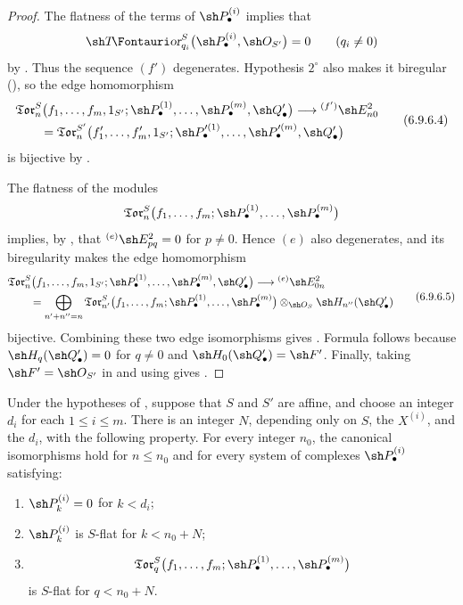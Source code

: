 \begin{proof}
The flatness of the terms of $\sh P_\bullet^{(i)}$ implies that
\[
  \shTor_{q_i}^S
  \bigl(
    \sh P_\bullet^{(i)},\sh O_{S'}
  \bigr)
  =
  0
  \qquad(q_i\neq0)
\]
by .  Thus the sequence $(f')$ degenerates.
Hypothesis $2^\circ$ also makes it biregular
(), so the edge homomorphism
\[
\begin{split}
  &
  \mathfrak{Tor}_n^S
  \bigl(
    f_1,\ldots,f_m,1_{S'};
    \sh P_\bullet^{(1)},\ldots,\sh P_\bullet^{(m)},
    \sh Q_\bullet'
  \bigr)
  \longrightarrow
  {}^{(f')}\sh E_{n0}^2
  \\
  &\qquad =
  \mathfrak{Tor}_n^{S'}
  \bigl(
    f_1',\ldots,f_m',1_{S'};
    \sh P_\bullet^{\prime(1)},\ldots,
    \sh P_\bullet^{\prime(m)},\sh Q_\bullet'
  \bigr)
\end{split}
  \tag{6.9.6.4}\label{III.6.9.6.4.eq}
\]
is bijective by .

The flatness of the modules
\[
  \mathfrak{Tor}_n^S
  \bigl(
    f_1,\ldots,f_m;
    \sh P_\bullet^{(1)},\ldots,\sh P_\bullet^{(m)}
  \bigr)
\]
implies, by , that
${}^{(e)}\sh E_{pq}^2=0$ for $p\neq0$.  Hence $(e)$ also
degenerates, and its biregularity makes the edge homomorphism
\[
\begin{split}
  &
  \mathfrak{Tor}_n^S
  \bigl(
    f_1,\ldots,f_m,1_{S'};
    \sh P_\bullet^{(1)},\ldots,\sh P_\bullet^{(m)},
    \sh Q_\bullet'
  \bigr)
  \longrightarrow
  {}^{(e)}\sh E_{0n}^2
  \\
  &\qquad =
  \bigoplus_{n'+n''=n}
  \mathfrak{Tor}_{n'}^S
  \bigl(
    f_1,\ldots,f_m;
    \sh P_\bullet^{(1)},\ldots,\sh P_\bullet^{(m)}
  \bigr)
  \otimes_{\sh O_S}
  \sh H_{n''}(\sh Q_\bullet')
\end{split}
  \tag{6.9.6.5}\label{III.6.9.6.5.eq}
\]
bijective.  Combining these two edge isomorphisms gives
.  Formula  follows because
$\sh H_q(\sh Q_\bullet')=0$ for $q\neq0$ and
$\sh H_0(\sh Q_\bullet')=\sh F'$.  Finally, taking
$\sh F'=\sh O_{S'}$ in  and using
 gives .
\end{proof}

\begin{corollary}[6.9.7]
\label{III.6.9.7}
Under the hypotheses of , suppose that $S$ and
$S'$ are affine, and choose an integer $d_i$ for each
$1\leq i\leq m$.  There is an integer $N$, depending only on $S$,
the $X^{(i)}$, and the $d_i$, with the following property.  For
every integer $n_0$, the canonical isomorphisms
 hold for $n\leq n_0$ and for every system of
complexes $\sh P_\bullet^{(i)}$ satisfying:
\begin{enumerate}
  \item[$1^\circ$] $\sh P_k^{(i)}=0$ for $k<d_i$;
  \item[$2^\circ$] $\sh P_k^{(i)}$ is $S$-flat for
  $k<n_0+N$;
  \item[$3^\circ$]
  \[
    \mathfrak{Tor}_q^S
    \bigl(
      f_1,\ldots,f_m;
      \sh P_\bullet^{(1)},\ldots,\sh P_\bullet^{(m)}
    \bigr)
  \]
  is $S$-flat for $q<n_0+N$.
\end{enumerate}
\end{corollary}

